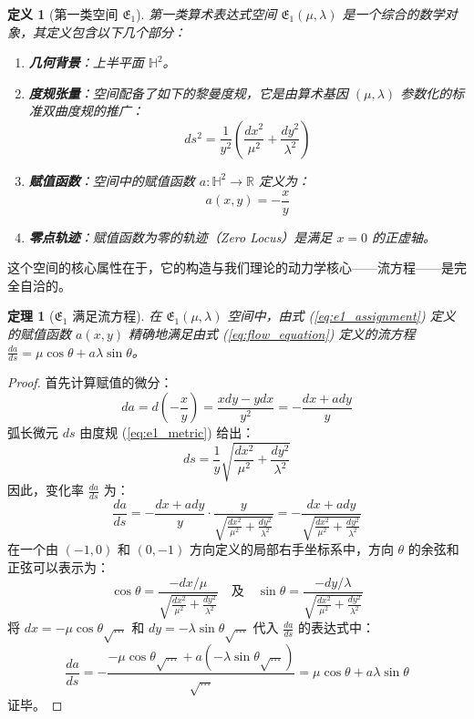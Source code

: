 \documentclass[a4paper,12pt]{book}
\numberwithin{problem}{section}
\newtheorem{definition}{定义}
\numberwithin{definition}{section}
\numberwithin{lemma}{section}
\numberwithin{proposition}{section}
\newtheorem{theorem}{定理}
\numberwithin{theorem}{section}
\numberwithin{grammar}{section}
\numberwithin{program}{section}
\numberwithin{convention}{section}
\numberwithin{corollary}{section}
\begin{document}
\begin{definition}[第一类空间 $\mathfrak{E}_1$]
    \label{def:space_e1}
    第一类算术表达式空间 $\mathfrak{E}_1(\mu, \lambda)$ 是一个综合的数学对象，其定义包含以下几个部分：
    \begin{enumerate}
        \item \textbf{几何背景}：上半平面 $\mathbb{H}^2$。
        \item \textbf{度规张量}：空间配备了如下的黎曼度规，它是由算术基因 $(\mu, \lambda)$ 参数化的标准双曲度规的推广：
        \begin{equation}
            ds^2 = \frac{1}{y^2}\left(\frac{dx^2}{\mu^2} + \frac{dy^2}{\lambda^2}\right)
            \label{eq:e1_metric}
        \end{equation}
        \item \textbf{赋值函数}：空间中的赋值函数 $a: \mathbb{H}^2 \to \mathbb{R}$ 定义为：
        \begin{equation}
            a(x, y) = - \frac{x}{y}
            \label{eq:e1_assignment}
        \end{equation}
        \item \textbf{零点轨迹}：赋值函数为零的轨迹（Zero Locus）是满足 $x=0$ 的正虚轴。
    \end{enumerate}
\end{definition}

这个空间的核心属性在于，它的构造与我们理论的动力学核心——流方程——是完全自洽的。

\begin{theorem}[$\mathfrak{E}_1$ 满足流方程]
    \label{thm:e1_satisfies_flow_equation}
    在 $\mathfrak{E}_1(\mu, \lambda)$ 空间中，由式 (\ref{eq:e1_assignment}) 定义的赋值函数 $a(x,y)$ 精确地满足由式 (\ref{eq:flow_equation}) 定义的流方程 $\frac{da}{ds} = \mu \cos\theta + a\lambda\sin\theta$。
\end{theorem}
\begin{proof}
    首先计算赋值的微分：
    \[ da = d\left(-\frac{x}{y}\right) = \frac{xdy - ydx}{y^2} = -\frac{dx + ady}{y} \]
    弧长微元 $ds$ 由度规 (\ref{eq:e1_metric}) 给出：
    \[ ds = \frac{1}{y}\sqrt{\frac{dx^2}{\mu^2} + \frac{dy^2}{\lambda^2}} \]
    因此，变化率 $\frac{da}{ds}$ 为：
    \[ \frac{da}{ds} = -\frac{dx + ady}{y} \cdot \frac{y}{\sqrt{\frac{dx^2}{\mu^2} + \frac{dy^2}{\lambda^2}}} = -\frac{dx + ady}{\sqrt{\frac{dx^2}{\mu^2} + \frac{dy^2}{\lambda^2}}} \]
    在一个由 $(-1,0)$ 和 $(0,-1)$ 方向定义的局部右手坐标系中，方向 $\theta$ 的余弦和正弦可以表示为：
    \[ \cos\theta = \frac{-dx/\mu}{\sqrt{\frac{dx^2}{\mu^2} + \frac{dy^2}{\lambda^2}}} \quad \text{及} \quad \sin\theta = \frac{-dy/\lambda}{\sqrt{\frac{dx^2}{\mu^2} + \frac{dy^2}{\lambda^2}}} \]
    将 $dx = -\mu \cos\theta \sqrt{\dots}$ 和 $dy = -\lambda \sin\theta \sqrt{\dots}$ 代入 $\frac{da}{ds}$ 的表达式中：
    \[ \frac{da}{ds} = -\frac{-\mu \cos\theta \sqrt{\dots} + a(-\lambda \sin\theta \sqrt{\dots})}{\sqrt{\dots}} = \mu \cos\theta + a\lambda\sin\theta \]
    证毕。
\end{proof}
\end{document}
